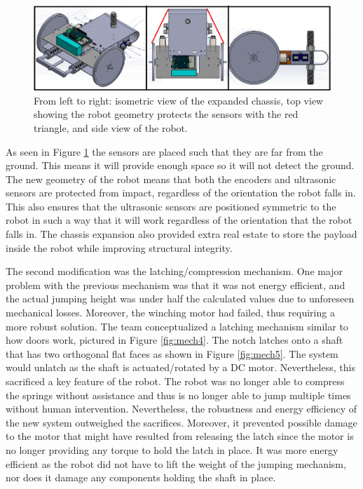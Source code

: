 \documentclass[ece]{uw-wkrpt}
\begin{document}
\begin{figure}[!htb]
    \centering
      \captionsetup{justification=centering}
    \includegraphics[width=5.5in]{res/mech3}
    \caption[Different views of final design]
          {From left to right: isometric view of the expanded chassis, top view showing the robot geometry protects the sensors with the red triangle, and side view of the robot.}
    \label{fig:mech3}
\end{figure}

As seen in Figure \ref{fig:mech3} the sensors are placed such that they are far from the ground. This means it will provide enough space so it will not detect the ground. The new geometry of the robot means that both the encoders and ultrasonic sensors are protected from impact, regardless of the orientation the robot falls in. This also ensures that the ultrasonic sensors are positioned symmetric to the robot in such a way that it will work regardless of the orientation that the robot falls in. The chassis expansion also provided extra real estate to store the payload inside the robot while improving structural integrity.

The second modification was the latching/compression mechanism. One major problem with the previous mechanism was that it was not energy efficient, and the actual jumping height was under half the calculated values due to unforeseen mechanical losses. Moreover, the winching motor had failed, thus requiring a more robust solution. The team conceptualized a latching mechanism similar to how doors work, pictured in Figure \ref{fig:mech4}. The notch latches onto a shaft that has two orthogonal flat faces as shown in Figure \ref{fig:mech5}. The system would unlatch as the shaft is actuated/rotated by a DC motor. Nevertheless, this sacrificed a key feature of the robot. The robot was no longer able to compress the springs without assistance and thus is no longer able to jump multiple times without human intervention. Nevertheless, the robustness and energy efficiency of the new system outweighed the sacrifices. Moreover, it prevented possible damage to the motor that might have resulted from releasing the latch since the motor is no longer providing any torque to hold the latch in place. It was more energy efficient as the robot did not have to lift the weight of the jumping mechanism, nor does it damage any components holding the shaft in place. 
\end{document}
